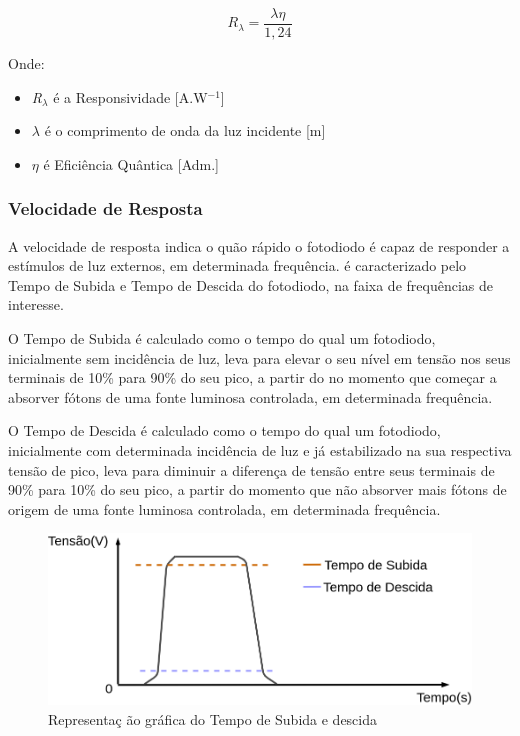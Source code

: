 \begin{equation}
    R_\lambda = \frac{\lambda\eta}{1,24}
\end{equation}

Onde:
\begin{itemize}
    \item \emph{R$_\lambda$} \'e a Responsividade [A.W$^{-1}$]
    \item $\lambda$ \'e o comprimento de onda da luz incidente [m]
    \item $\eta$ \'e Efici\^encia Qu\^antica [Adm.]
\end{itemize}

\subsubsection{Velocidade de Resposta}
A velocidade de resposta indica o quão rápido o fotodiodo \'e capaz de responder a estímulos de luz externos, em determinada frequência. \'e caracterizado pelo Tempo de Subida e Tempo de Descida do fotodiodo, na faixa de frequências de interesse.

O Tempo de Subida \'e calculado como o tempo do qual um fotodiodo, inicialmente sem incidência de luz, leva para elevar o seu nível em tensão nos seus terminais de 10\% para 90\% do seu pico, a partir do no momento que começar a absorver fótons de uma fonte luminosa controlada, em determinada frequência.

O Tempo de Descida \'e calculado como o tempo do qual um fotodiodo, inicialmente com determinada incidência de luz e já estabilizado na sua respectiva tensão de pico, leva para diminuir a diferença de tensão entre seus terminais de 90\% para 10\% do seu pico, a partir do momento que não absorver mais fótons de origem de uma fonte luminosa controlada, em determinada frequência.

\begin{figure}[htb]
	\caption{\label{fig_velocidadeResp}Representa{\c c} \~ao gr\'afica do Tempo de Subida e descida}
	\begin{center}
	    \includegraphics[scale=0.3]{Imagens/GraficoVelocidadeResposta.png}
	\end{center}
\end{figure}

